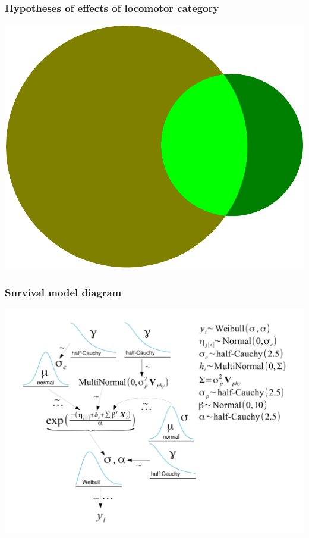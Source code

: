 \documentclass{beamer}
\begin{document}
\begin{frame}
  \frametitle{Hypotheses of effects of locomotor category}
  \begin{center}
    \includegraphics[width = \textwidth,height = 0.8\textheight,keepaspectratio = true]{figure/loco_later}
  \end{center}
\end{frame}

\begin{frame}
  \frametitle{Survival model diagram}
  \begin{center}
    \includegraphics[height=0.8\textheight,keepaspectratio=true]{figure/mammal_survival_model}
  \end{center}
\end{frame}
\end{document}
